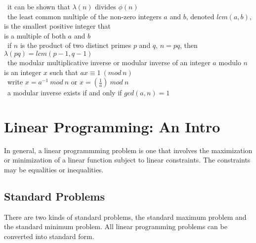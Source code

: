 \documentclass[10pt,letterpaper]{scrartcl}
\newcommand{\tbul}{\textbullet}
\newcommand{\tend}{\>\textendash}
\begin{document}
\begin{tabbing}
\tend\ it can be shown that $\lambda (n)$ divides $\phi (n)$ \\
\tbul\ the least common multiple of the non-zero integers $a$ and $b$, denoted $lcm(a,b)$, is the smallest positive integer that \\ is a multiple of both $a$ and $b$ \\
\tbul\ if $n$ is the product of two distinct primes $p$ and $q$, $n=pq$, then $\lambda (pq)=lcm(p-1, q-1)$ \\
\tbul\ the modular multiplicative inverse or modular inverse of an integer $a$ modulo $n$ is an integer $x$ such that $ax\equiv 1\ (mod\ n)$ \\
\tend\ write $x = a^{-1}\ mod\ n$ or $x=(\frac{1}{a})\ mod\ n$ \\
\tend\ a modular inverse exists if and only if $gcd(a, n)=1$ \end{tabbing}

\newpage\section{Linear Programming: An Intro}
In general, a linear programmming problem is one that involves the maximization or minimization of a linear function subject to linear constraints. The constraints may be equalities or inequalities. 
\subsection{Standard Problems}
There are two kinds of standard problems, the standard maximum problem and the standard minimum problem. All linear programming problems can be converted into standard form. 
\end{document}
